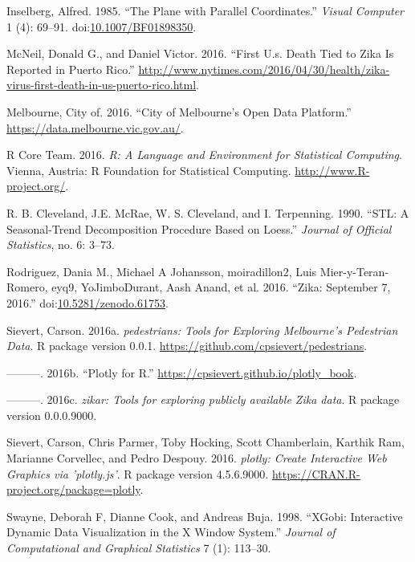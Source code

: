 \documentclass[12pt,]{article}
\theoremstyle{definition}
\theoremstyle{definition}
\theoremstyle{remark}
\begin{document}
\hypertarget{ref-Inselberg:85}{}
Inselberg, Alfred. 1985. ``The Plane with Parallel Coordinates.''
\emph{Visual Computer} 1 (4): 69--91.
doi:\href{https://doi.org/10.1007/BF01898350}{10.1007/BF01898350}.

\hypertarget{ref-zika-nyt}{}
McNeil, Donald G., and Daniel Victor. 2016. ``First U.s. Death Tied to
Zika Is Reported in Puerto Rico.''
\url{http://www.nytimes.com/2016/04/30/health/zika-virus-first-death-in-us-puerto-rico.html}.

\hypertarget{ref-melbourne}{}
Melbourne, City of. 2016. ``City of Melbourne's Open Data Platform.''
\url{https://data.melbourne.vic.gov.au/}.

\hypertarget{ref-RCore}{}
R Core Team. 2016. \emph{R: A Language and Environment for Statistical
Computing}. Vienna, Austria: R Foundation for Statistical Computing.
\url{http://www.R-project.org/}.

\hypertarget{ref-stl}{}
R. B. Cleveland, J.E. McRae, W. S. Cleveland, and I. Terpenning. 1990.
``STL: A Seasonal-Trend Decomposition Procedure Based on Loess.''
\emph{Journal of Official Statistics}, no. 6: 3--73.

\hypertarget{ref-zika-data}{}
Rodriguez, Dania M., Michael A Johansson, moiradillon2, Luis
Mier-y-Teran-Romero, eyq9, YoJimboDurant, Aash Anand, et al. 2016.
``Zika: September 7, 2016.''
doi:\href{https://doi.org/10.5281/zenodo.61753}{10.5281/zenodo.61753}.

\hypertarget{ref-pedestrians}{}
Sievert, Carson. 2016a. \emph{pedestrians: Tools for Exploring
Melbourne's Pedestrian Data}. R package version 0.0.1.
\url{https://github.com/cpsievert/pedestrians}.

\hypertarget{ref-plotly-book}{}
---------. 2016b. ``Plotly for R.''
\url{https://cpsievert.github.io/plotly_book}.

\hypertarget{ref-zikar}{}
---------. 2016c. \emph{zikar: Tools for exploring publicly available
Zika data}. R package version 0.0.0.9000.

\hypertarget{ref-plotly}{}
Sievert, Carson, Chris Parmer, Toby Hocking, Scott Chamberlain, Karthik
Ram, Marianne Corvellec, and Pedro Despouy. 2016. \emph{plotly: Create
Interactive Web Graphics via 'plotly.js'}. R package version 4.5.6.9000.
\url{https://CRAN.R-project.org/package=plotly}.

\hypertarget{ref-xgobi}{}
Swayne, Deborah F, Dianne Cook, and Andreas Buja. 1998. ``XGobi:
Interactive Dynamic Data Visualization in the X Window System.''
\emph{Journal of Computational and Graphical Statistics} 7 (1): 113--30.
\end{document}
